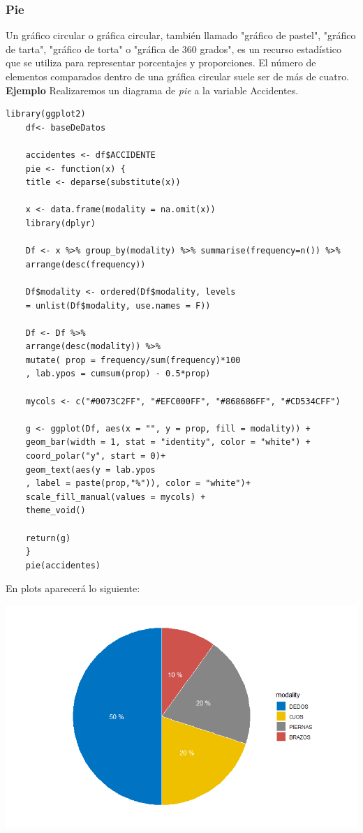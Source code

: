 \documentclass[12pt,hidelinks]{article}
\begin{document}
	\subsubsection{Pie}
	Un gráfico circular o gráfica circular, también llamado "gráfico de pastel", "gráfico de tarta", "gráfico de torta" o "gráfica de 360 grados", es un recurso estadístico que se utiliza para representar porcentajes y proporciones. El número de elementos comparados dentro de una gráfica circular suele ser de más de cuatro. \textbf{Ejemplo} Realizaremos un diagrama de \textit{pie} a la variable Accidentes.
	\begin{lstlisting}[frame=single]
	library(ggplot2)
	df<- baseDeDatos
	
	accidentes <- df$ACCIDENTE
	pie <- function(x) {
	title <- deparse(substitute(x))
	
	x <- data.frame(modality = na.omit(x))
	library(dplyr)
	
	Df <- x %>% group_by(modality) %>% summarise(frequency=n()) %>%
	arrange(desc(frequency))
	
	Df$modality <- ordered(Df$modality, levels 
	= unlist(Df$modality, use.names = F))
	
	Df <- Df %>%
	arrange(desc(modality)) %>%
	mutate( prop = frequency/sum(frequency)*100 
	, lab.ypos = cumsum(prop) - 0.5*prop)
	
	mycols <- c("#0073C2FF", "#EFC000FF", "#868686FF", "#CD534CFF")
	
	g <- ggplot(Df, aes(x = "", y = prop, fill = modality)) +
	geom_bar(width = 1, stat = "identity", color = "white") +
	coord_polar("y", start = 0)+
	geom_text(aes(y = lab.ypos
	, label = paste(prop,"%")), color = "white")+
	scale_fill_manual(values = mycols) +
	theme_void()
	
	return(g)
	}
	pie(accidentes)
	\end{lstlisting}
	En plots aparecerá lo siguiente:
	\begin{center}
		\includegraphics[width = 14cm]{GC.png}
	\end{center}
\end{document}
